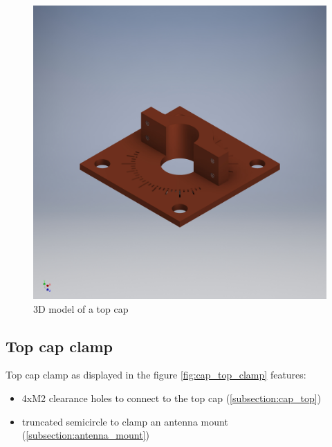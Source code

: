 \begin{figure}[h]
	\centering
	\includegraphics[width=\textwidth]{images/cap_top}
	\caption{3D model of a top cap}
	\label{fig:cap_top}
\end{figure}

\clearpage
\subsection{Top cap clamp}
\label{subsection:cap_top_clamp}
Top cap clamp as displayed in the figure \ref{fig:cap_top_clamp} features:
\begin{itemize}
	\item 4xM2 clearance holes to connect to the top cap (\ref{subsection:cap_top})
	\item truncated semicircle to clamp an antenna mount (\ref{subsection:antenna_mount})
\end{itemize}

